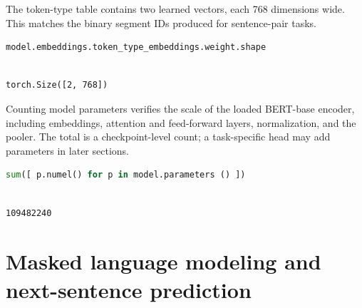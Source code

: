 \documentclass[../labs.tex]{subfiles}
\begin{document}
The token-type table contains two learned vectors, each 768 dimensions wide. This matches the binary segment IDs produced for sentence-pair tasks.


\begin{lstlisting}[language=Python,basicstyle=\ttfamily\scriptsize,breaklines=true,breakatwhitespace=false,columns=fullflexible,keepspaces=true,numbers=none]
model.embeddings.token_type_embeddings.weight.shape
\end{lstlisting}

\hypertarget{out:lab03-bert-c13}{}\label{out:lab03-bert-c13}

\begin{lstlisting}[style=terminalOutput,breakatwhitespace=false,columns=fullflexible]

torch.Size([2, 768])

\end{lstlisting}


Counting model parameters verifies the scale of the loaded BERT-base encoder, including embeddings, attention and feed-forward layers, normalization, and the pooler. The total is a checkpoint-level count; a task-specific head may add parameters in later sections.


\begin{lstlisting}[language=Python,basicstyle=\ttfamily\scriptsize,breaklines=true,breakatwhitespace=false,columns=fullflexible,keepspaces=true,numbers=none]
sum([ p.numel() for p in model.parameters () ])
\end{lstlisting}

\hypertarget{out:lab03-bert-c14}{}\label{out:lab03-bert-c14}

\begin{lstlisting}[style=terminalOutput,breakatwhitespace=false,columns=fullflexible]

109482240

\end{lstlisting}

\section{Masked language modeling and next-sentence prediction}
\end{document}
